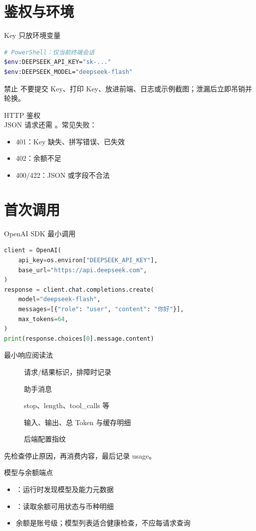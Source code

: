 \documentclass[aspectratio=169,UTF8]{ctexbeamer}
\begin{document}
\section{鉴权与环境}
\begin{frame}[fragile]{Key 只放环境变量}
\begin{lstlisting}[language=bash]
# PowerShell：仅当前终端会话
$env:DEEPSEEK_API_KEY="sk-..."
$env:DEEPSEEK_MODEL="deepseek-flash"
\end{lstlisting}
\begin{alertblock}{禁止}
不要提交 Key、打印 Key、放进前端、日志或示例截图；泄漏后立即吊销并轮换。
\end{alertblock}
\end{frame}
\begin{frame}{HTTP 鉴权}
\\[8pt]
JSON 请求还需 。常见失败：
\begin{itemize}
  \item 401：Key 缺失、拼写错误、已失效
  \item 402：余额不足
  \item 400/422：JSON 或字段不合法
\end{itemize}
\end{frame}
\section{首次调用}
\begin{frame}[fragile]{OpenAI SDK 最小调用}
\begin{lstlisting}[language=Python]
client = OpenAI(
    api_key=os.environ["DEEPSEEK_API_KEY"],
    base_url="https://api.deepseek.com",
)
response = client.chat.completions.create(
    model="deepseek-flash",
    messages=[{"role": "user", "content": "你好"}],
    max_tokens=64,
)
print(response.choices[0].message.content)
\end{lstlisting}
\end{frame}
\begin{frame}{最小响应阅读法}
\begin{description}
  \item[] 请求/结果标识，排障时记录
  \item[] 助手消息
  \item[] stop、length、tool\_calls 等
  \item[] 输入、输出、总 Token 与缓存明细
  \item[] 后端配置指纹
\end{description}
先检查停止原因，再消费内容，最后记录 usage。
\end{frame}
\begin{frame}{模型与余额端点}
\begin{itemize}
  \item {}：运行时发现模型及能力元数据
  \item {}：读取余额可用状态与币种明细
  \item 余额是账号级；模型列表适合健康检查，不应每请求查询
\end{itemize}
\end{frame}
\end{document}
